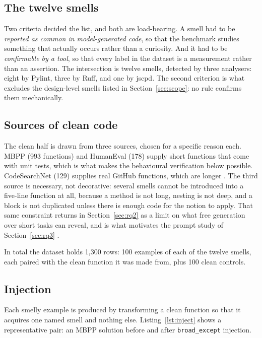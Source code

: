 \documentclass[10pt,a4paper,twocolumn]{article}
\begin{document}
\subsection{The twelve smells}

Two criteria decided the list, and both are load-bearing. A smell had to be
\emph{reported as common in model-generated code}, so that the benchmark studies
something that actually occurs rather than a curiosity. And it had to be
\emph{confirmable by a tool}, so that every label in the dataset is a
measurement rather than an assertion. The intersection is twelve smells, detected by three analysers: eight by Pylint,
three by Ruff, and one by jscpd. The second criterion is what excludes the
design-level smells listed in Section~\ref{sec:scope}: no rule confirms them
mechanically.

\subsection{Sources of clean code}

The clean half is drawn from three sources, chosen for a specific reason each.
MBPP (993 functions) and HumanEval (178) supply short functions that come with
unit tests, which is what makes the behavioural verification below possible.
CodeSearchNet (129) supplies real GitHub functions, which are longer
\cite{codesearchnet2019}. The third source is necessary, not decorative: several
smells cannot be introduced into a five-line function at all, because a method
is not long, nesting is not deep, and a block is not duplicated unless there is
enough code for the notion to apply. That same constraint returns in
Section~\ref{sec:rq2} as a limit on what free generation over short tasks can
reveal, and is what motivates the prompt study of Section~\ref{sec:rq3}
\cite{codesmell2026}.

In total the dataset holds 1{,}300 rows: 100 examples of each of the twelve
smells, each paired with the clean function it was made from, plus 100 clean
controls.

\subsection{Injection}

Each smelly example is produced by transforming a clean function so that it
acquires one named smell and nothing else. Listing~\ref{lst:inject} shows a
representative pair: an MBPP solution before and after \texttt{broad\_except}
injection.
\end{document}
